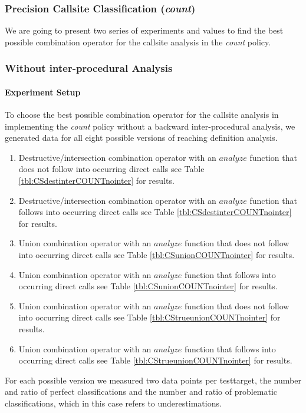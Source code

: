 \newpage

\subsubsection{Precision Callsite Classification (\textit{count})}
\label{subsection:typeshieldprecision}
We are going to present two series of experiments and values to find the best possible combination operator for the callsite analysis in the \textit{count} policy.
\subsubsection{Without inter-procedural Analysis}

\paragraph{Experiment Setup}
To choose the best possible combination operator for the callsite analysis in implementing the \textit{count} policy without a backward inter-procedural analysis, we generated data for all eight possible versions of reaching definition analysis.
\begin{enumerate}
\item Destructive/intersection combination operator with an $analyze$ function that does not follow into occurring direct calls see Table \ref{tbl:CSdestinterCOUNTnointer} for results.
\item Destructive/intersection combination operator with an $analyze$ function that follows into occurring direct calls see Table \ref{tbl:CSdestinterCOUNTnointer} for results.
\item Union combination operator with an $analyze$ function that does not follow into occurring direct calls see Table \ref{tbl:CSunionCOUNTnointer} for results.
\item Union combination operator with an $analyze$ function that follows into occurring direct calls see Table \ref{tbl:CSunionCOUNTnointer} for results.
\item Union combination operator with an $analyze$ function that does not follow into occurring direct calls see Table \ref{tbl:CStrueunionCOUNTnointer} for results.
\item Union combination operator with an $analyze$ function that follows into occurring direct calls see Table \ref{tbl:CStrueunionCOUNTnointer} for results.
\end{enumerate}
For each possible version we measured two data points per testtarget, the number and ratio of perfect classifications and the number and ratio of problematic classifications, which in this case refers to underestimations.

